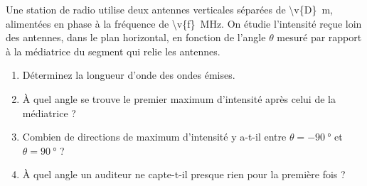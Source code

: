 Une station de radio utilise deux antennes verticales séparées de \qty{\v{D}}{m}, alimentées en phase à la fréquence de \qty{\v{f}}{MHz}. On étudie l'intensité reçue loin des antennes, dans le plan horizontal, en fonction de l'angle $\theta$ mesuré par rapport à la médiatrice du segment qui relie les antennes.

\begin{enumerate}[label=\alph*)]
    \item Déterminez la longueur d'onde des ondes émises.
    \item À quel angle se trouve le premier maximum d'intensité après celui de la médiatrice ?
    \item Combien de directions de maximum d'intensité y a-t-il entre $\theta = \qty{-90}{\degree}$ et $\theta = \qty{90}{\degree}$ ?
    \item À quel angle un auditeur ne capte-t-il presque rien pour la première fois ?
\end{enumerate}
